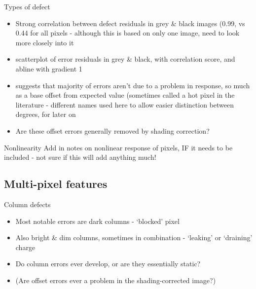 \documentclass{beamer}
\begin{document}
\begin{frame}{Types of defect}%
  \begin{itemize}
  		\item Strong correlation between defect residuals in grey \& black images (0.99, vs 0.44 for all pixels - although this is based on only one image, need to look more closely into it
  		\item scatterplot of error residuals in grey \& black, with correlation score, and abline with gradient 1
  		\item suggests that majority of errors aren't due to a problem in response, so much as a base offset from expected value (sometimes called a hot pixel in the literature - different names used here to allow easier distinction between degrees, for later on
  		\item Are these offset errors generally removed by shading correction?
  \end{itemize}
\end{frame}

\begin{frame}{Nonlinearity}
	Add in notes on nonlinear response of pixels, IF it needs to be included - not sure if this will add anything much!
\end{frame}


\subsection{Multi-pixel features}

\begin{frame}{Column defects}
	
	\begin{itemize}
		\item Most notable errors are dark columns - `blocked' pixel
		\item Also bright \& dim columns, sometimes in combination - `leaking' or `draining' charge
		\item Do column errors ever develop, or are they essentially static?
		\item (Are offset errors ever a problem in the shading-corrected image?)
	\end{itemize}
\end{frame}

\end{document}
